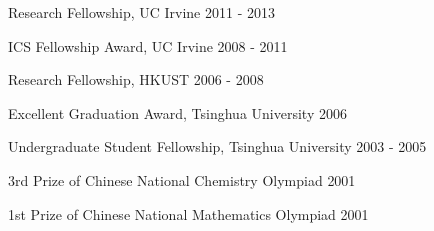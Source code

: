 \documentclass[margin]{res3}
\newenvironment{list1}{
  \begin{list}{\ding{113}}{%
      \setlength{\itemsep}{0.03in}
      \setlength{\parsep}{0in} \setlength{\parskip}{0in}
      \setlength{\topsep}{0in} \setlength{\partopsep}{0in}
      \setlength{\leftmargin}{0in}}}{\end{list}}
\begin{document}
\begin{resume}
\begin{list1}
\item[] Research Fellowship, UC Irvine \hfill{2011 - 2013}

\item[]	ICS Fellowship Award, UC Irvine \hfill{2008 - 2011}

\item[]	Research Fellowship, HKUST \hfill{2006 - 2008}

\item[]	Excellent Graduation Award, Tsinghua University \hfill{2006}

\item[] Undergraduate Student Fellowship, Tsinghua University \hfill{2003 - 2005}

\item[] 3rd Prize of Chinese National Chemistry Olympiad \hfill{2001}

\item[] 1st Prize of Chinese National Mathematics Olympiad \hfill{2001}

\end{list1}

% 
% 

% 
% 
% 
% 
% 



\end{resume}
\end{document}
